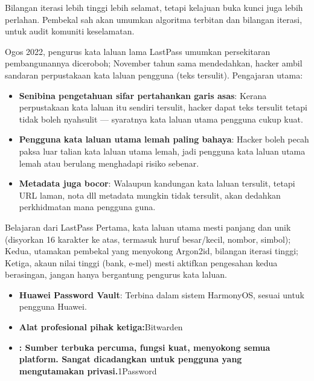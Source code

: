 Bilangan iterasi lebih tinggi lebih selamat, tetapi kelajuan buka kunci juga lebih perlahan. Pembekal sah akan umumkan algoritma terbitan dan bilangan iterasi, untuk audit komuniti keselamatan.


Ogos 2022, pengurus kata laluan lama LastPass umumkan persekitaran pembangunannya diceroboh; November tahun sama mendedahkan, hacker ambil sandaran perpustakaan kata laluan pengguna (teks tersulit). Pengajaran utama:

\begin{itemize}
  \item \textbf{Senibina pengetahuan sifar pertahankan garis asas}: Kerana perpustakaan kata laluan itu sendiri tersulit, hacker dapat teks tersulit tetapi tidak boleh nyahsulit — syaratnya kata laluan utama pengguna cukup kuat.
  \item \textbf{Pengguna kata laluan utama lemah paling bahaya}: Hacker boleh pecah paksa luar talian kata laluan utama lemah, jadi pengguna kata laluan utama lemah atau berulang menghadapi risiko sebenar.
  \item \textbf{Metadata juga bocor}: Walaupun kandungan kata laluan tersulit, tetapi URL laman, nota dll metadata mungkin tidak tersulit, akan dedahkan perkhidmatan mana pengguna guna.
\end{itemize}

\begin{tcbwarn}{Belajaran dari LastPass}
Pertama, kata laluan utama mesti panjang dan unik (disyorkan 16 karakter ke atas, termasuk huruf besar/kecil, nombor, simbol); Kedua, utamakan pembekal yang menyokong Argon2id, bilangan iterasi tinggi; Ketiga, akaun nilai tinggi (bank, e-mel) mesti aktifkan pengesahan kedua berasingan, jangan hanya bergantung pengurus kata laluan.

\end{tcbwarn}



\begin{itemize}
  \item \textbf{Huawei Password Vault}: Terbina dalam sistem HarmonyOS, sesuai untuk pengguna Huawei.
  \item \textbf{Alat profesional pihak ketiga:}Bitwarden
  \item \textbf{: Sumber terbuka percuma, fungsi kuat, menyokong semua platform. Sangat dicadangkan untuk pengguna yang mengutamakan privasi.}1Password
\end{itemize}


